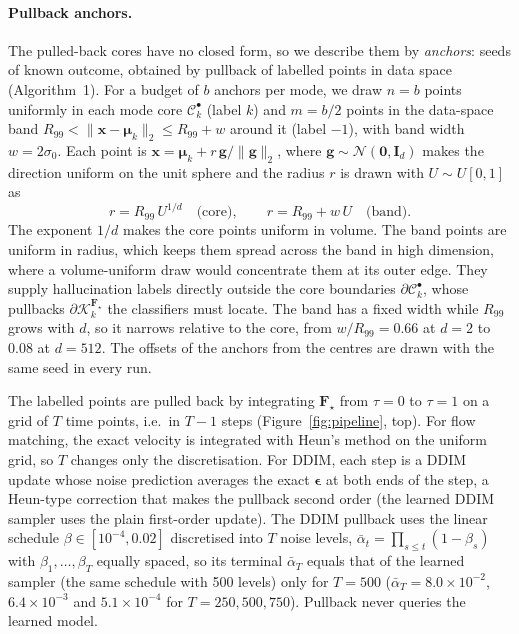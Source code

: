 \paragraph{Pullback anchors.}
The pulled-back cores have no closed form, so we describe them by \emph{anchors}: seeds of known
outcome, obtained by pullback of labelled points in data space (Algorithm~1). For a budget of $b$
anchors per mode, we draw $n = b$ points uniformly in each mode core $\mathcal{C}_k^\bullet$
(label $k$) and $m = b/2$ points in the data-space band
$R_{99} < \|\boldsymbol{x} - \boldsymbol{\mu}_k\|_2 \le R_{99} + w$ around it (label $-1$), with
band width $w = 2\sigma_0$. Each point is
$\boldsymbol{x} = \boldsymbol{\mu}_k + r\, \boldsymbol{g}/\|\boldsymbol{g}\|_2$, where
$\boldsymbol{g} \sim \mathcal{N}(\boldsymbol{0}, \boldsymbol{I}_d)$ makes the direction uniform on
the unit sphere and the radius $r$ is drawn with $U \sim U[0, 1]$ as
\begin{equation}
    r = R_{99}\, U^{1/d} \quad \text{(core)}, \qquad
    r = R_{99} + w\, U \quad \text{(band)}.
\end{equation}
The exponent $1/d$ makes the core points uniform in volume. The band points are uniform in radius,
which keeps them spread across the band in high dimension, where a volume-uniform draw would
concentrate them at its outer edge. They supply hallucination labels directly outside the core
boundaries $\partial\mathcal{C}_k^\bullet$, whose pullbacks
$\partial\mathcal{K}_k^{\boldsymbol{F}_\star}$ the classifiers must locate. The band has a fixed
width while $R_{99}$ grows with $d$, so it narrows relative to the core, from $w/R_{99} = 0.66$ at
$d = 2$ to $0.08$ at $d = 512$. The offsets of the anchors from the centres are drawn with the same
seed in every run.

The labelled points are pulled back by integrating $\boldsymbol{F}_\star$ from $\tau = 0$ to
$\tau = 1$ on a grid of $T$ time points, i.e.\ in $T - 1$ steps (Figure~\ref{fig:pipeline}, top).
For flow matching, the exact velocity is integrated with Heun's method on the uniform grid, so $T$
changes only the discretisation. For DDIM, each step is a DDIM update whose noise prediction
averages the exact $\boldsymbol{\epsilon}$ at both ends of the step, a Heun-type correction that
makes the pullback second order (the learned DDIM sampler uses the plain first-order update). The
DDIM pullback uses the linear schedule $\beta \in [10^{-4}, 0.02]$ discretised into $T$ noise
levels, $\bar\alpha_t = \prod_{s \le t}(1 - \beta_s)$ with $\beta_1, \dots, \beta_T$ equally
spaced, so its terminal $\bar\alpha_T$ equals that of the learned sampler (the same schedule with
500 levels) only for $T = 500$ ($\bar\alpha_T = 8.0\times10^{-2}$, $6.4\times10^{-3}$ and
$5.1\times10^{-4}$ for $T = 250, 500, 750$). Pullback never queries the learned model.

